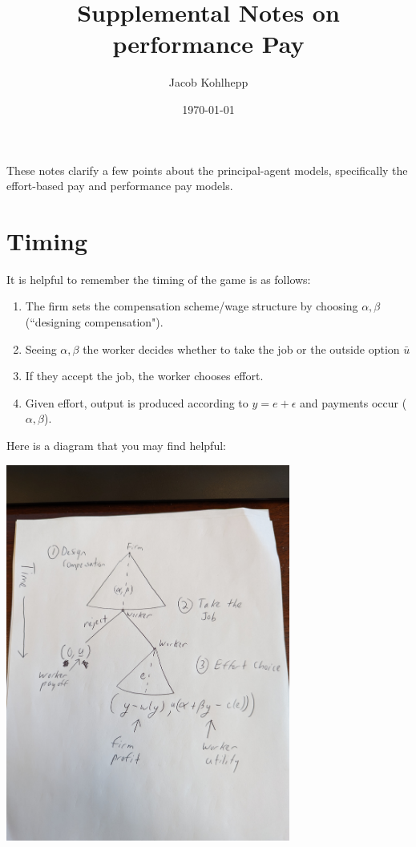 \documentclass{article}
\title{Supplemental Notes on performance Pay}
\author{Jacob Kohlhepp}
\date{\today}
\begin{document}
\maketitle

These notes clarify a few points about the principal-agent models, specifically the effort-based pay and performance pay models.

\section{Timing}

It is helpful to remember the timing of the game is as follows:

\begin{enumerate}
    \item The firm sets the compensation scheme/wage structure by choosing $\alpha, \beta$ (``designing compensation").
    \item Seeing $\alpha, \beta$ the worker decides whether to take the job or the outside option $\bar u$
    \item If they accept the job, the worker chooses effort.
    \item Given effort, output is produced according to $y=e+\epsilon$ and payments occur ($\alpha,\beta$).
\end{enumerate}

Here is a diagram that you may find helpful:

\includegraphics[width=0.7\textwidth]{pictures/PXL_20240131_180348343.jpg}
\end{document}
